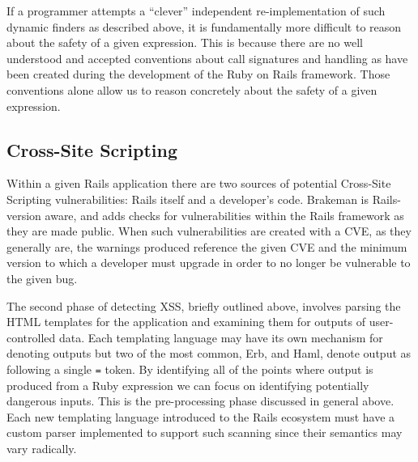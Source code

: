 \documentclass[conference]{IEEEtran}
\begin{document}
If a programmer attempts a ``clever'' independent re-implementation of such
dynamic finders as described above, it is fundamentally more difficult to reason
about the safety of a given expression.  This is because there are no well understood and
accepted conventions about call signatures and handling as have been created during the
development of the Ruby on Rails framework.  Those conventions alone allow us to reason
concretely about the safety of a given expression.

\subsection{Cross-Site Scripting}

Within a given Rails application there are two sources of potential Cross-Site
Scripting vulnerabilities: Rails itself and a developer's code.  Brakeman is
Rails-version aware, and adds checks for vulnerabilities within the Rails
framework as they are made public.  When such vulnerabilities are created with a
CVE, as they generally are, the warnings produced reference the given CVE and
the minimum version to which a developer must upgrade in order to no longer be
vulnerable to the given bug.

The second phase of detecting XSS, briefly outlined above, involves parsing the
HTML templates for the application and examining them for outputs of
user-controlled data.  Each templating language may have its own mechanism for
denoting outputs but two of the most common, Erb, and Haml, denote output as
following a single \texttt{=} token.  By identifying all of the points where
output is produced from a Ruby expression we can focus on identifying
potentially dangerous inputs.  This is the pre-processing phase discussed in
general above.  Each new templating language introduced to the Rails ecosystem
must have a custom parser implemented to support such scanning since their
semantics may vary radically.
\end{document}
